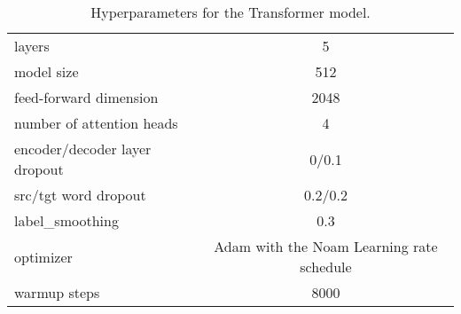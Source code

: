 \begin{table}[h]
\centering
\begin{tabular}{l|c} \toprule
 layers                        & 5 \\
 model size                    & 512 \\
 feed-forward dimension        & 2048 \\
 number of attention heads     & 4 \\
 encoder/decoder layer dropout & 0/0.1 \\
 src/tgt word dropout          & 0.2/0.2 \\
 label\_smoothing              & 0.3 \\
 optimizer                     & Adam with the Noam Learning rate schedule \\
 warmup steps                  & 8000 \\ \bottomrule
\end{tabular}
\caption{Hyperparameters for the Transformer model.}
\label{hyperparameters}
\end{table}
